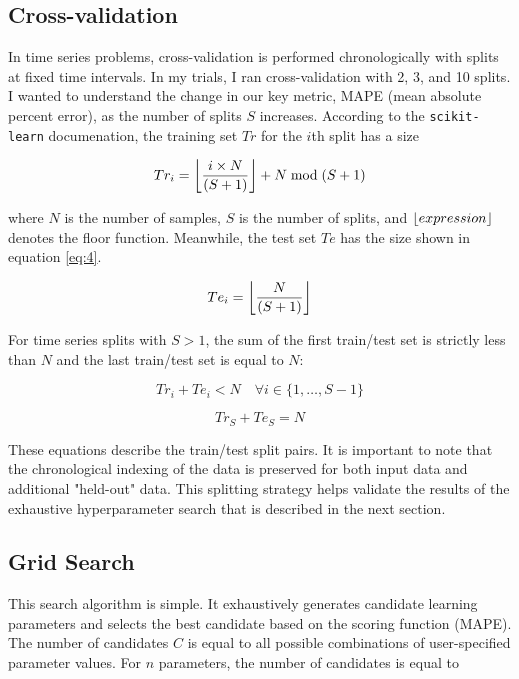 \documentclass[11pt, oneside]{article}
\DeclarePairedDelimiter{\floor}{\lfloor}{\rfloor}
\begin{document}
\subsection{Cross-validation}
\label{cross_validation}
In time series problems, cross-validation is performed chronologically with splits at fixed time intervals. In my trials, I ran cross-validation with 2, 3, and 10 splits. I wanted to understand the change in our key metric, MAPE (mean absolute percent error), as the number of splits $S$ increases. According to the \texttt{scikit-learn} documenation, the training set $Tr$ for the $i$th split has a size

\begin{equation}
  \label{eq:3}
  Tr_{i} = \floor*{\frac{i \times N}{(S + 1)}} + N \bmod (S + 1)
\end{equation}

where $N$ is the number of samples, $S$ is the number of splits, and $\floor{expression}$ denotes the floor function. Meanwhile, the test set $Te$ has the size shown in equation \ref{eq:4}.

\begin{equation}
  \label{eq:4}
  Te_{i} = \floor*{\frac{N}{(S + 1)}}
\end{equation}

For time series splits with $S>1$, the sum of the first train/test set is strictly less than $N$ and the last train/test set is equal to $N$:

\begin{equation}
  \label{eq:5}
  Tr_{i} + Te_{i} < N \quad \forall i \in \{1, \dots, S-1\}
\end{equation}

\begin{equation}
  \label{eq:6}
  Tr_{S} + Te_{S} = N
\end{equation}

These equations describe the train/test split pairs. It is important to note that the chronological indexing of the data is preserved for both input data and additional "held-out" data. This splitting strategy helps validate the results of the exhaustive hyperparameter search that is described in the next section.
\subsection{Grid Search}
This search algorithm is simple. It exhaustively generates candidate learning parameters and selects the best candidate based on the scoring function (MAPE). The number of candidates $C$ is equal to all possible combinations of user-specified parameter values. For $n$ parameters, the number of candidates is equal to
\end{document}

